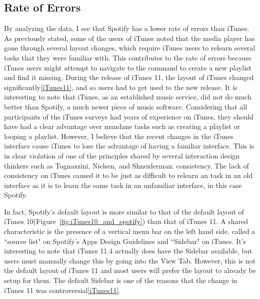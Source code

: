 \documentclass[11pt]{article}
\begin{document}
\subsection{Rate of Errors}
By analyzing the data, I see that Spotify has a lower rate of errors than iTunes. As previously stated, some of the users of iTunes noted that the media player has gone through several layout changes, which require iTunes users to relearn several tasks that they were familiar with. This contributes to the rate of errors because iTunes users might attempt to navigate to the command to create a new playlist and find it missing. During the release of iTunes 11, the layout of iTunes changed significantly\ref{iTunes11}, and so users had to get used to the new release. It is interesting to note that iTunes, as an established music service, did not do much better than Spotify, a much newer piece of music software. Considering that all participants of the iTunes surveys had years of experience on iTunes, they should have had a clear advantage over mundane tasks such as creating a playlist or looping a playlist. However, I believe that the recent changes in the iTunes interface cause iTunes to lose the advantage of having a familiar interface. This is in clear violation of one of the principles shared by several interaction design thinkers such as Tognazzini, Nielsen, and Shneiderman: consistency. The lack of consistency on iTunes caused it to be just as difficult to relearn an task in an old interface as it is to learn the same task in an unfamiliar interface, in this case Spotify. 

In fact, Spotify's default layout is more similar to that of the default layout of iTunes 10(Figure~\ref{fig:iTunes10_and_spotify}) than that of iTunes 11. A shared characteristic is the presence of a vertical menu bar on the left hand side, called a ``source list" on Spotify's Apps Design Guidelines and ``Sidebar" on iTunes. It's interesting to note that iTunes 11.4 actually does have the Sidebar available, but users must manually change this by going into the View Tab. However, this is not the default layout of iTunes 11 and most users will prefer the layout to already be setup for them. The default Sidebar is one of the reasons that the change in iTunes 11 was controversial\ref{iTunes11}.
\end{document}
